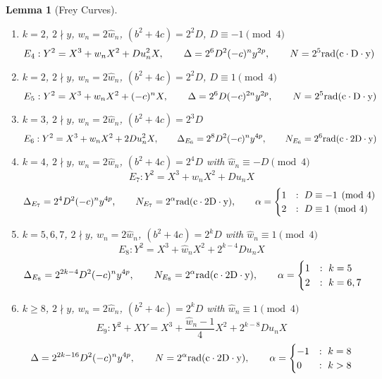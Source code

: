 \documentclass[12pt]{amsart}
\newtheorem{lem}[thm]{Lemma}
\theoremstyle{definition}
\newcommand{\rad}{\rm rad}
\newcommand{\notdiv}{\nmid}
\begin{document}
\begin{lem}[Frey Curves]
\begin{enumerate}[1.]
\item $k = 2$, $2 \notdiv y$, $w_n = 2 \hat{w}_n$, $(b^2+4c) = 2^{2}D$, $D \equiv -1 \pmod{4}$
\[ E_{4} : Y^2 = X^3 + w_nX^2 +Du_n^2X, \qquad \Delta = 2^{6}D^2(-c)^ny^{2p}, \qquad N = 2^{5}\rad( c \cdot D \cdot y )  \]

\item $k = 2$, $2 \notdiv y$, $w_n = 2 \hat{w}_n$, $(b^2+4c) = 2^{2}D$, $D \equiv 1 \pmod{4}$
\[E_{5} : Y^2 = X^3 +w_nX^2 +(-c)^nX, \qquad \Delta = 2^{6}D(-c)^{2n}y^{2p}, \qquad N = 2^{5}\rad( c \cdot D \cdot y )  \]

\item $k = 3$, $2 \notdiv y$, $w_n = 2 \hat{w}_n$, $(b^2+4c) = 2^{3}D$
\[ E_{6} : Y^2 = X^3 + w_nX^2 + 2Du_n^2X, \qquad  \Delta_{E_6} = 2^8D^2(-c)^ny^{4p} , \qquad N_{E_6} = 2^6 \rad( c \cdot 2D \cdot y)  \]

\item $k=4$, $2 \notdiv y$, $w_n = 2 \hat{w}_n$, $(b^2+4c) = 2^{4}D$ with $\hat{w}_n \equiv -D \pmod{4}$
\[ E_{7} : Y^2 = X^3 +\hat{w}_nX^2 + D u_n X\]
 \[ \Delta_{E_7} = 2^4D^2(-c)^ny^{4p}, \qquad N_{E_7} = 2^\alpha \rad( c \cdot 2D \cdot y) ,  \qquad \alpha =  \begin{cases} 1 & : \ D \equiv -1 \pmod{4}\\ 2 & : \ D \equiv 1 \pmod{4} \end{cases} \]


\item $k = 5,6,7$, $2 \notdiv y$, $w_n = 2 \hat{w}_n$, $(b^2+4c) = 2^{k}D$ with $\hat{w}_n \equiv 1 \pmod{4}$
\[ E_{8} : Y^2 = X^3 + \hat{w}_nX^2 + 2^{k-4}D u_n X \]
\[ \Delta_{E_8} = 2^{2k-4}D^2(-c)^ny^{4p}, \qquad N_{E_8} = 2^\alpha \rad(c \cdot 2D \cdot y ) ,  \qquad \alpha =  \begin{cases} 1&:  \ k = 5 \\ 2 &:  \ k = 6,7 \end{cases} \]


\item $k\geq 8$, $2 \notdiv y$, $w_n = 2 \hat{w}_n$, $(b^2+4c) = 2^{k}D$ with $\hat{w}_n \equiv 1 \pmod{4}$
\[ E_{9} : Y^2 + XY = X^3 + \frac{\hat{w}_n-1}{4} X^2 + 2^{k-8}D u_n X \]
\[ \Delta = 2^{2k-16}D^2(-c)^ny^{4p}, \qquad N = 2^\alpha \rad(c \cdot 2D \cdot y) ,  \qquad \alpha =  \begin{cases} -1&: \ k = 8 \\ 0 &: \ k > 8 \end{cases} \]


\end{enumerate}
\end{lem}
\end{document}

